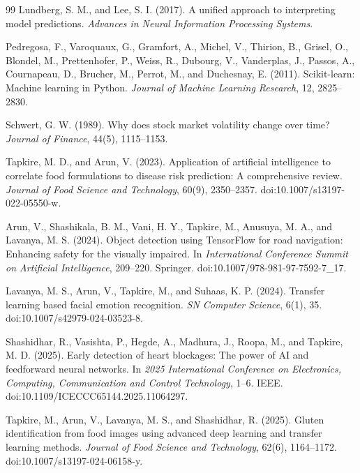 \documentclass[12pt,a4paper]{article}
\begin{document}
\begin{thebibliography}{99}
Lundberg, S. M., and Lee, S. I. (2017). A unified approach to interpreting model predictions. \textit{Advances in Neural Information Processing Systems}.

Pedregosa, F., Varoquaux, G., Gramfort, A., Michel, V., Thirion, B., Grisel, O., Blondel, M., Prettenhofer, P., Weiss, R., Dubourg, V., Vanderplas, J., Passos, A., Cournapeau, D., Brucher, M., Perrot, M., and Duchesnay, E. (2011). Scikit-learn: Machine learning in Python. \textit{Journal of Machine Learning Research}, 12, 2825--2830.

Schwert, G. W. (1989). Why does stock market volatility change over time? \textit{Journal of Finance}, 44(5), 1115--1153.

Tapkire, M. D., and Arun, V. (2023). Application of artificial intelligence to correlate food formulations to disease risk prediction: A comprehensive review. \textit{Journal of Food Science and Technology}, 60(9), 2350--2357. doi:10.1007/s13197-022-05550-w.

Arun, V., Shashikala, B. M., Vani, H. Y., Tapkire, M., Anusuya, M. A., and Lavanya, M. S. (2024). Object detection using TensorFlow for road navigation: Enhancing safety for the visually impaired. In \textit{International Conference Summit on Artificial Intelligence}, 209--220. Springer. doi:10.1007/978-981-97-7592-7\_17.

Lavanya, M. S., Arun, V., Tapkire, M., and Suhaas, K. P. (2024). Transfer learning based facial emotion recognition. \textit{SN Computer Science}, 6(1), 35. doi:10.1007/s42979-024-03523-8.

Shashidhar, R., Vasishta, P., Hegde, A., Madhura, J., Roopa, M., and Tapkire, M. D. (2025). Early detection of heart blockages: The power of AI and feedforward neural networks. In \textit{2025 International Conference on Electronics, Computing, Communication and Control Technology}, 1--6. IEEE. doi:10.1109/ICECCC65144.2025.11064297.

Tapkire, M., Arun, V., Lavanya, M. S., and Shashidhar, R. (2025). Gluten identification from food images using advanced deep learning and transfer learning methods. \textit{Journal of Food Science and Technology}, 62(6), 1164--1172. doi:10.1007/s13197-024-06158-y.


\end{thebibliography}
\end{document}
